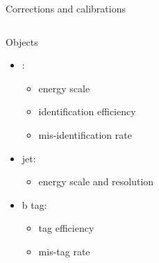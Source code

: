 \begin{frame}{Corrections and calibrations}
\begin{columns}
\begin{block}{Objects}
\begin{itemize}
                \item \PGth: 
                \begin{itemize}
                \smaller
                    \item energy scale
                    \item identification efficiency
                    \item \alert{mis-identification rate}
                \end{itemize}
                \item jet: 
                \begin{itemize}
                \smaller
                    \item energy scale and resolution
                \end{itemize}
                \item b tag: 
                \begin{itemize}
                \smaller
                    \item tag efficiency
                    \item mis-tag rate
                \end{itemize}
            \end{itemize}
        \end{block}
        
    \end{columns}
\end{frame}



